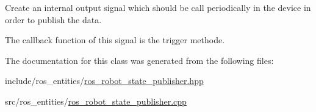Create an internal output signal which should be call periodically in the device in order to publish the data. 

The callback function of this signal is the trigger methode. 

The documentation for this class was generated from the following files\+:\begin{DoxyCompactItemize}
\item 
include/ros\+\_\+entities/\hyperlink{ros__robot__state__publisher_8hpp}{ros\+\_\+robot\+\_\+state\+\_\+publisher.\+hpp}\item 
src/ros\+\_\+entities/\hyperlink{ros__robot__state__publisher_8cpp}{ros\+\_\+robot\+\_\+state\+\_\+publisher.\+cpp}\end{DoxyCompactItemize}
